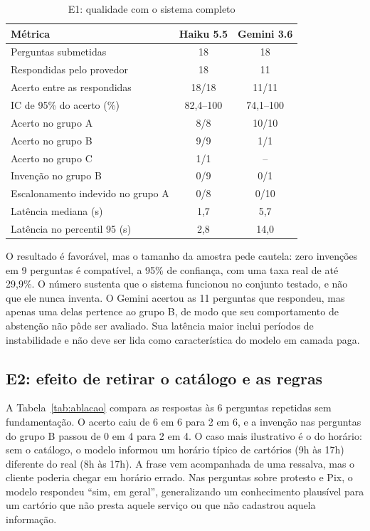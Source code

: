 \documentclass[conference]{IEEEtran}
\begin{document}
\begin{table}[t]
\caption{E1: qualidade com o sistema completo}
\label{tab:qualidade}
\centering
\footnotesize
\setlength{\tabcolsep}{4pt}
\begin{tabular}{@{}L{4.1cm}cc@{}}
\toprule
\textbf{Métrica} & \textbf{Haiku 5.5} & \textbf{Gemini 3.6} \\
\midrule
Perguntas submetidas & 18 & 18 \\
Respondidas pelo provedor & 18 & 11 \\
Acerto entre as respondidas & 18/18 & 11/11 \\
IC de 95\% do acerto (\%) & 82,4--100 & 74,1--100 \\
Acerto no grupo A & 8/8 & 10/10 \\
Acerto no grupo B & 9/9 & 1/1 \\
Acerto no grupo C & 1/1 & -- \\
Invenção no grupo B & 0/9 & 0/1 \\
Escalonamento indevido no grupo A & 0/8 & 0/10 \\
Latência mediana (s) & 1,7 & 5,7 \\
Latência no percentil 95 (s) & 2,8 & 14,0 \\
\bottomrule
\end{tabular}
\end{table}

O resultado é favorável, mas o tamanho da amostra pede cautela: zero invenções em 9 perguntas é compatível, a 95\% de confiança, com uma taxa real de até 29,9\%. O número sustenta que o sistema funcionou no conjunto testado, e não que ele nunca inventa. O Gemini acertou as 11 perguntas que respondeu, mas apenas uma delas pertence ao grupo B, de modo que seu comportamento de abstenção não pôde ser avaliado. Sua latência maior inclui períodos de instabilidade e não deve ser lida como característica do modelo em camada paga.

\subsection{E2: efeito de retirar o catálogo e as regras}

A Tabela~\ref{tab:ablacao} compara as respostas às 6 perguntas repetidas sem fundamentação. O acerto caiu de 6 em 6 para 2 em 6, e a invenção nas perguntas do grupo B passou de 0 em 4 para 2 em 4. O caso mais ilustrativo é o do horário: sem o catálogo, o modelo informou um horário típico de cartórios (9h às 17h) diferente do real (8h às 17h). A frase vem acompanhada de uma ressalva, mas o cliente poderia chegar em horário errado. Nas perguntas sobre protesto e Pix, o modelo respondeu ``sim, em geral'', generalizando um conhecimento plausível para um cartório que não presta aquele serviço ou que não cadastrou aquela informação.
\end{document}
